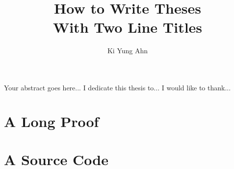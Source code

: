 \documentclass[12pt]{report}
\numberwithin{equation}{section}
\numberwithin{theorem}{section}
\numberwithin{lemma}{section}
\numberwithin{corollary}{section}
\begin{document}
\title{How to Write Theses \\ With Two Line Titles}

\author{Ki Yung Ahn}

\titlep
\prefatory
{}
    Your abstract goes here...
    I dedicate this thesis to...
    I would like to thank...

\afterpreface
\body





\appendix
\chapter{A Long Proof}
\chapter{A Source Code}
\end{document}
